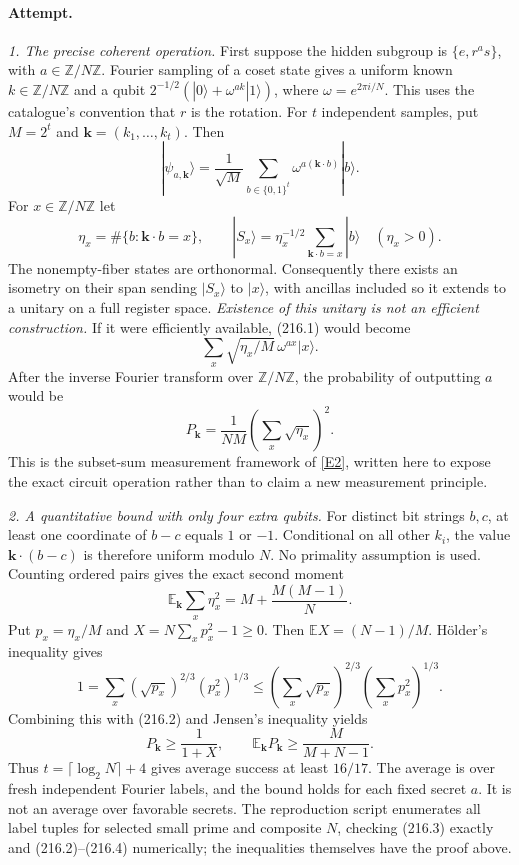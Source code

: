 \documentclass[11pt,a4paper]{article}
\newcommand{\Z}{\mathbb{Z}}
\newcommand{\E}{\mathbb{E}}
\newcommand{\eref}[2]{\hyperlink{extra:#1:#2}{[E#2]}}
\begin{document}
\paragraph{Attempt.}
\textit{1. The precise coherent operation.}
First suppose the hidden subgroup is $\{e,r^a s\}$, with
$a\in\Z/N\Z$. Fourier sampling of a coset state gives a uniform known
$k\in\Z/N\Z$ and a qubit
$2^{-1/2}(|0\rangle+\omega^{ak}|1\rangle)$,
where $\omega=e^{2\pi i/N}$. This uses the catalogue's convention that
$r$ is the rotation. For $t$ independent samples, put $M=2^t$ and
$\mathbf k=(k_1,\ldots,k_t)$. Then
\[
 |\psi_{a,\mathbf k}\rangle
   =\frac1{\sqrt M}\sum_{b\in\{0,1\}^t}
                      \omega^{a(\mathbf k\cdot b)}|b\rangle.
                                                               \tag{216.1}
\]
For $x\in\Z/N\Z$ let
\[
 \eta_x=\#\{b:\mathbf k\cdot b=x\},\qquad
 |S_x\rangle=\eta_x^{-1/2}\sum_{\mathbf k\cdot b=x}|b\rangle
 \quad(\eta_x>0).
\]
The nonempty-fiber states are orthonormal. Consequently there exists an
isometry on their span sending $|S_x\rangle$ to $|x\rangle$, with
ancillas included so it extends to a unitary on a full register space.
\emph{Existence of this unitary is not an efficient construction.}
If it were efficiently available, (216.1) would become
\[
 \sum_x\sqrt{\eta_x/M}\,\omega^{ax}|x\rangle.
\]
After the inverse Fourier transform over $\Z/N\Z$, the probability of
outputting $a$ would be
\[
 P_{\mathbf k}=\frac1{NM}\left(\sum_x\sqrt{\eta_x}\right)^2.
                                                               \tag{216.2}
\]
This is the subset-sum measurement framework of \eref{statement}{2}, written
here to expose the exact circuit operation rather than to claim a new
measurement principle.

\textit{2. A quantitative bound with only four extra qubits.}
For distinct bit strings $b,c$, at least one coordinate of $b-c$ equals
$1$ or $-1$. Conditional on all other $k_i$, the value
$\mathbf k\cdot(b-c)$ is therefore uniform modulo $N$. No primality
assumption is used. Counting ordered pairs gives the exact second moment
\[
 \E_{\mathbf k}\sum_x\eta_x^2
       =M+\frac{M(M-1)}N.                                  \tag{216.3}
\]
Put $p_x=\eta_x/M$ and $X=N\sum_xp_x^2-1\ge0$. Then
$\E X=(N-1)/M$. H\"older's inequality gives
\[
 1=\sum_x (\sqrt{p_x})^{2/3}(p_x^2)^{1/3}
 \le\left(\sum_x\sqrt{p_x}\right)^{2/3}
       \left(\sum_xp_x^2\right)^{1/3}.
\]
Combining this with (216.2) and Jensen's inequality yields
\[
 P_{\mathbf k}\ge\frac1{1+X},\qquad
 \E_{\mathbf k}P_{\mathbf k}
       \ge\frac{M}{M+N-1}.                                \tag{216.4}
\]
Thus $t=\lceil\log_2N\rceil+4$ gives average success at least $16/17$.
The average is over fresh independent Fourier labels, and the bound holds
for each fixed secret $a$. It is not an average over favorable secrets.
The reproduction script enumerates all label tuples for selected small
prime and composite $N$, checking (216.3) exactly and (216.2)--(216.4)
numerically; the inequalities themselves have the proof above.
\end{document}
